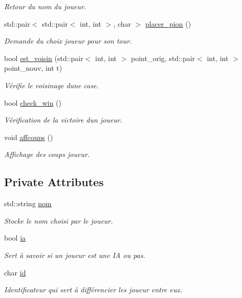 \begin{DoxyCompactItemize}
\begin{DoxyCompactList}\small\item\em Retour du nom du joueur. \end{DoxyCompactList}\item 
std\+::pair$<$ std\+::pair$<$ int, int $>$, char $>$ \hyperlink{classplayer_a77fa6645cfe49dd34b36dc1f5b7649e4}{placer\+\_\+pion} ()
\begin{DoxyCompactList}\small\item\em Demande du choix joueur pour son tour. \end{DoxyCompactList}\item 
bool \hyperlink{classplayer_a24a75aa099e5a4eac97d3898fde40a3b}{est\+\_\+voisin} (std\+::pair$<$ int, int $>$ point\+\_\+orig, std\+::pair$<$ int, int $>$ point\+\_\+nouv, int t)
\begin{DoxyCompactList}\small\item\em Vérifie le voisinage d\textquotesingle{}une case. \end{DoxyCompactList}\item 
bool \hyperlink{classplayer_a5eddf905f6904f5737b4f36f7f0ab428}{check\+\_\+win} ()
\begin{DoxyCompactList}\small\item\em Vérification de la victoire d\textquotesingle{}un joueur. \end{DoxyCompactList}\item 
void \hyperlink{classplayer_a2590189e7416dc8a5cf2686a606f138b}{affcoups} ()
\begin{DoxyCompactList}\small\item\em Affichage des coups joueur. \end{DoxyCompactList}\end{DoxyCompactItemize}
\subsection*{Private Attributes}
\begin{DoxyCompactItemize}
\item 
std\+::string \hyperlink{classplayer_ae6c0f854d63dc4b938b52f10b4334dbc}{nom}
\begin{DoxyCompactList}\small\item\em Stocke le nom choisi par le joueur. \end{DoxyCompactList}\item 
bool \hyperlink{classplayer_ab5c7590da844e3e2128868820ab9ec45}{ia}
\begin{DoxyCompactList}\small\item\em Sert à savoir si un joueur est une IA ou pas. \end{DoxyCompactList}\item 
char \hyperlink{classplayer_a5862f005a5367e1b0dc19bdf2846fd34}{id}
\begin{DoxyCompactList}\small\item\em Identificateur qui sert à différencier les joueur entre eux. \end{DoxyCompactList}\end{DoxyCompactItemize}



